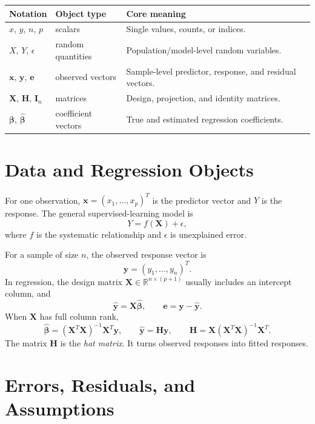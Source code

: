 {\begin{center}
\begin{tabular}{p{}p{}p{}}
\toprule
\textbf{Notation} & \textbf{Object type} & \textbf{Core meaning} \\
\midrule
$x$, $y$, $n$, $p$ & scalars & Single values, counts, or indices. \\
$X$, $Y$, $\epsilon$ & random quantities & Population/model-level random variables. \\
$\mathbf{x}$, $\mathbf{y}$, $\mathbf{e}$ & observed vectors & Sample-level predictor, response, and residual vectors. \\
$\mathbf{X}$, $\mathbf{H}$, $\mathbf{I}_n$ & matrices & Design, projection, and identity matrices. \\
$\boldsymbol{\beta}$, $\widehat{\boldsymbol{\beta}}$ & coefficient vectors & True and estimated regression coefficients. \\
\bottomrule
\end{tabular}
\end{center}

\section*{Data and Regression Objects}

For one observation, $\mathbf{x}=(x_1,\ldots,x_p)^T$ is the predictor vector and $Y$ is the response.  The general supervised-learning model is
\[
  Y=f(\mathbf{X})+\epsilon,
\]
where $f$ is the systematic relationship and $\epsilon$ is unexplained error.

For a sample of size $n$, the observed response vector is
\[
  \mathbf{y}=(y_1,\ldots,y_n)^T.
\]
In regression, the design matrix $\mathbf{X}\in\mathbb{R}^{n\times(p+1)}$ usually includes an intercept column, and
\[
  \widehat{\mathbf{y}}=\mathbf{X}\widehat{\boldsymbol{\beta}},
  \qquad
  \mathbf{e}=\mathbf{y}-\widehat{\mathbf{y}}.
\]
When $\mathbf{X}$ has full column rank,
\[
  \widehat{\boldsymbol{\beta}}
  =(\mathbf{X}^T\mathbf{X})^{-1}\mathbf{X}^T\mathbf{y},
  \qquad
  \widehat{\mathbf{y}}=\mathbf{H}\mathbf{y},
  \qquad
  \mathbf{H}=\mathbf{X}(\mathbf{X}^T\mathbf{X})^{-1}\mathbf{X}^T.
\]
The matrix $\mathbf{H}$ is the \emph{hat matrix}.  It turns observed responses into fitted responses.

\section*{Errors, Residuals, and Assumptions}

}
